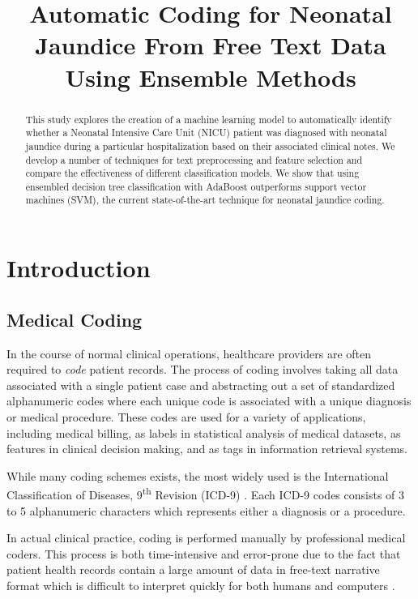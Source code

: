 \documentclass[conference]{IEEEtran}
\begin{document}
\title{Automatic Coding for Neonatal Jaundice From Free Text Data Using Ensemble Methods
}


\author{
}

\maketitle

\begin{abstract}
This study explores the creation of a machine learning model to automatically identify whether a Neonatal Intensive Care Unit (NICU) patient was diagnosed with neonatal jaundice during a particular hospitalization based on their associated clinical notes. We develop a number of techniques for text preprocessing and feature selection and compare the effectiveness of different classification models. We show that using ensembled decision tree classification with AdaBoost outperforms support vector machines (SVM), the current state-of-the-art technique for neonatal jaundice coding.
\end{abstract}

\section{Introduction}
\subsection{Medical Coding}\label{AA}
In the course of normal clinical operations, healthcare providers are often required to \textit{code} patient records. The process of coding involves taking all data associated with a single patient case and abstracting out a set of standardized alphanumeric codes where each unique code is associated with a unique diagnosis or medical procedure. These codes are used for a variety of applications, including medical billing, as labels in statistical analysis of medical datasets, as features in clinical decision making, and as tags in information retrieval systems. 

While many coding schemes exists, the most widely used is the International Classification of Diseases, 9\textsuperscript{th} Revision (ICD-9) \cite{Slee}. Each ICD-9 codes consists of 3 to 5 alphanumeric characters which represents either a diagnosis or a procedure.

In actual clinical practice, coding is performed manually by professional medical coders. This process is both time-intensive and error-prone due to the fact that patient health records contain a large amount of data in free-text narrative format which is difficult to interpret quickly for both humans and computers \cite{Tange}\cite{OMalley}. 
\end{document}

